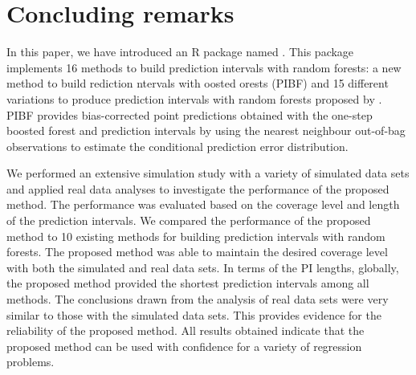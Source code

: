 \section{Concluding remarks}

In this paper, we have introduced an R package named . This package implements 16 methods to build prediction intervals with random forests: a new method to build rediction ntervals with oosted orests (PIBF) and 15 different variations to produce prediction intervals with random forests proposed by \citet{roy_prediction_2020}. PIBF provides bias-corrected point predictions obtained with the one-step boosted forest and prediction intervals by using the nearest neighbour out-of-bag observations to estimate the conditional prediction error distribution.

We performed an extensive simulation study with a variety of simulated data sets and applied real data analyses to investigate the performance of the proposed method. The performance was evaluated based on the coverage level and length of the prediction intervals. We compared the performance of the proposed method to 10 existing methods for building prediction intervals with random forests. The proposed method was able to maintain the desired coverage level with both the simulated and real data sets. In terms of the PI lengths, globally, the proposed method provided the shortest prediction intervals among all methods. The conclusions drawn from the analysis of real data sets were very similar to those with the simulated data sets. This provides evidence for the reliability of the proposed method. All results obtained indicate that the proposed method can be used with confidence for a variety of regression problems.

